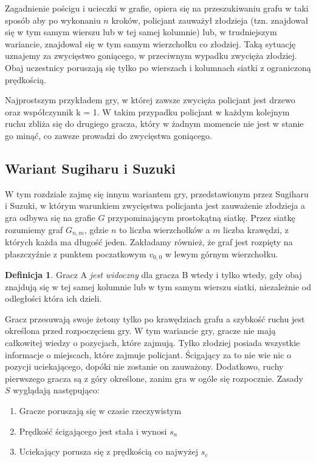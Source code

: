 \documentclass[brudnopis]{xmgr}
\theoremstyle{definition}
\newtheorem{Definicja}{Definicja}
\begin{document}
Zagadnienie pościgu i ucieczki w grafie, opiera się na przeszukiwaniu grafu w taki sposób aby po wykonaniu $n$ kroków, policjant zauważył złodzieja (tzn. znajdował się w tym samym wierszu lub w tej samej kolumnie) lub, w trudniejszym wariancie, znajdował się w tym samym wierzchołku co złodziej. Taką sytuację uznajemy za zwycięstwo goniącego, w przeciwnym wypadku zwycięża złodziej. Obaj uczestnicy poruszają się tylko po wierszach i kolumnach siatki z ograniczoną prędkością.

Najprostszym przykładem gry, w której zawsze zwycięża policjant jest drzewo oraz współczynnik k = 1. W takim przypadku policjant w każdym kolejnym ruchu zbliża się do drugiego gracza, który w żadnym momencie nie jest w stanie go minąć, co zawsze prowadzi do zwycięstwa goniącego.

\subsection{Wariant Sugiharu i Suzuki}
W tym rozdziale zajmę się innym wariantem gry, przedstawionym przez Sugiharu i Suzuki, w którym warunkiem zwycięstwa policjanta jest zauważenie złodzieja a gra odbywa się na grafie $G$ przypominającym prostokątną siatkę.
Przez siatkę rozumiemy graf $G_{n,m}$, gdzie $n$ to liczba wierzchołków a $m$ liczba krawędzi, z których każda ma długość jeden. Zakładamy również, że graf jest rozpięty na płaszczyźnie z punktem poczatkowym $v_{0,0}$ w lewym górnym wierzchołku.
\begin{Definicja}
  Gracz A \emph{jest widoczny} dla gracza B wtedy i tylko wtedy, gdy obaj znajdują się w tej samej kolumnie lub w tym samym wierszu siatki, niezależnie od odległości która ich dzieli.
\end{Definicja}

Gracz przesuwają swoje żetony tylko po krawędziach grafu a szybkość ruchu jest określona przed rozpoczęciem gry.
W tym wariancie gry, gracze nie mają całkowitej wiedzy o pozycjach, które zajmują. Tylko złodziej posiada wszystkie informacje o miejscach, które zajmuje policjant. Ścigający za to nie wie nic o pozycji uciekającego, dopóki nie zostanie on zauważony. Dodatkowo, ruchy pierwszego gracza są z góry określone, zanim gra w ogóle się rozpocznie.
Zasady $S$ wyglądają następująco:
\begin{enumerate}
  \item Gracze poruszają się w czasie rzeczywistym
  \item Prędkość ścigającego jest stała i wynosi $s_n$
  \item Uciekający porusza się z prędkością co najwyżej $s_c$
\end{enumerate}
\end{document}
